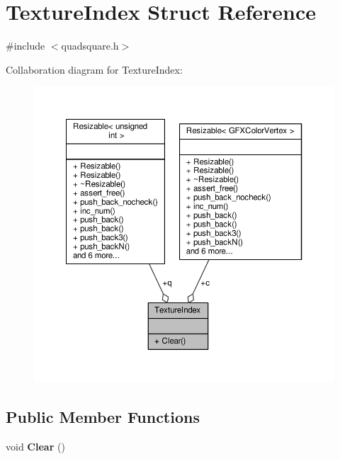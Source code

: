 \hypertarget{structTextureIndex}{}\section{Texture\+Index Struct Reference}
\label{structTextureIndex}


{\ttfamily \#include $<$quadsquare.\+h$>$}



Collaboration diagram for Texture\+Index\+:
\nopagebreak
\begin{figure}[H]
\begin{center}
\leavevmode
\includegraphics[width=350pt]{d3/d45/structTextureIndex__coll__graph}
\end{center}
\end{figure}
\subsection*{Public Member Functions}
\begin{DoxyCompactItemize}
\item 
void {\bfseries Clear} ()\hypertarget{structTextureIndex_a74cd1c2f373e41d5695f77c75903ba35}{}\label{structTextureIndex_a74cd1c2f373e41d5695f77c75903ba35}

\end{DoxyCompactItemize}
